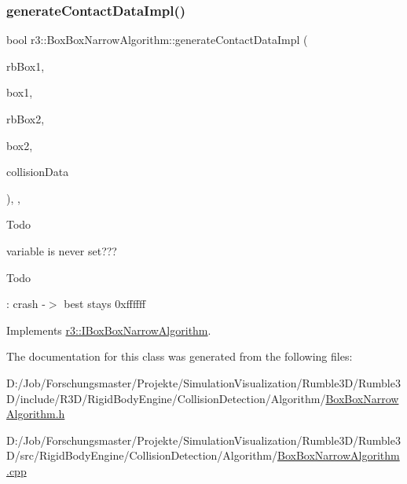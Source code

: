 \subsubsection{\texorpdfstring{generate\+Contact\+Data\+Impl()}{generateContactDataImpl()}}
{\footnotesize\ttfamily bool r3\+::\+Box\+Box\+Narrow\+Algorithm\+::generate\+Contact\+Data\+Impl (\begin{DoxyParamCaption}\item[{\mbox{\hyperlink{classr3_1_1_rigid_body}{Rigid\+Body}} $\ast$}]{rb\+Box1,  }\item[{\mbox{\hyperlink{classr3_1_1_collision_box}{Collision\+Box}} $\ast$}]{box1,  }\item[{\mbox{\hyperlink{classr3_1_1_rigid_body}{Rigid\+Body}} $\ast$}]{rb\+Box2,  }\item[{\mbox{\hyperlink{classr3_1_1_collision_box}{Collision\+Box}} $\ast$}]{box2,  }\item[{\mbox{\hyperlink{classr3_1_1_collision_data}{Collision\+Data}} \&}]{collision\+Data }\end{DoxyParamCaption})\hspace{0.3cm}{\ttfamily [override]}, {\ttfamily [protected]}, {\ttfamily [virtual]}}

\begin{DoxyRefDesc}{Todo}
\item[\mbox{\hyperlink{todo__todo000004}{Todo}}]variable is never set??? \end{DoxyRefDesc}


\begin{DoxyRefDesc}{Todo}
\item[\mbox{\hyperlink{todo__todo000005}{Todo}}]\+: crash -\/$>$ best stays 0xffffff \end{DoxyRefDesc}


Implements \mbox{\hyperlink{classr3_1_1_i_box_box_narrow_algorithm_abc15898100b5ed0537e4c6ccc6610069}{r3\+::\+I\+Box\+Box\+Narrow\+Algorithm}}.



The documentation for this class was generated from the following files\+:\begin{DoxyCompactItemize}
\item 
D\+:/\+Job/\+Forschungsmaster/\+Projekte/\+Simulation\+Visualization/\+Rumble3\+D/\+Rumble3\+D/include/\+R3\+D/\+Rigid\+Body\+Engine/\+Collision\+Detection/\+Algorithm/\mbox{\hyperlink{_box_box_narrow_algorithm_8h}{Box\+Box\+Narrow\+Algorithm.\+h}}\item 
D\+:/\+Job/\+Forschungsmaster/\+Projekte/\+Simulation\+Visualization/\+Rumble3\+D/\+Rumble3\+D/src/\+Rigid\+Body\+Engine/\+Collision\+Detection/\+Algorithm/\mbox{\hyperlink{_box_box_narrow_algorithm_8cpp}{Box\+Box\+Narrow\+Algorithm.\+cpp}}\end{DoxyCompactItemize}
